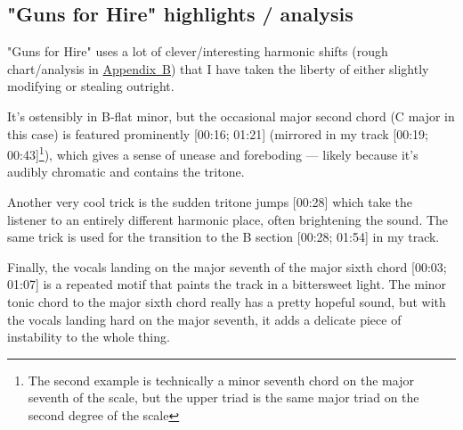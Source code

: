 \subsection*{"Guns for Hire" highlights / analysis}

"Guns for Hire" uses a lot of clever/interesting harmonic shifts (rough chart/analysis in \hyperref[appendixB]{Appendix~B}) that I have taken the liberty of either slightly modifying or stealing outright.

It's ostensibly in B-flat minor, but the occasional major second chord (C major in this case) is featured prominently [00:16; 01:21] (mirrored in my track [00:19; 00:43]\footnote{The second example is technically a minor seventh chord on the major seventh of the scale, but the upper triad is the same major triad on the second degree of the scale}), which gives a sense of unease and foreboding --- likely because it's audibly chromatic and contains the tritone.

Another very cool trick is the sudden tritone jumps [00:28] which take the listener to an entirely different harmonic place, often brightening the sound. The same trick is used for the transition to the B section [00:28; 01:54] in my track.

Finally, the vocals landing on the major seventh of the major sixth chord  [00:03; 01:07] is a repeated motif that paints the track in a bittersweet light. The minor tonic chord to the major sixth chord really has a pretty hopeful sound, but with the vocals landing hard on the major seventh, it adds a delicate piece of instability to the whole thing.
